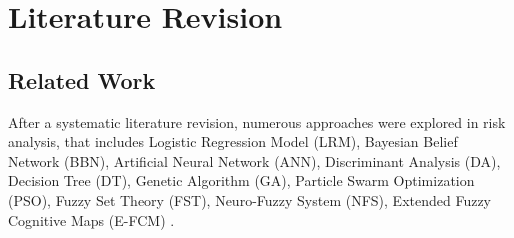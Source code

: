 \chapter{Literature Revision}\label{cap:background}

\section{Related Work}

After a systematic literature revision, numerous approaches were explored in risk analysis, that includes Logistic Regression Model (LRM), Bayesian Belief Network (BBN), Artificial Neural Network (ANN), Discriminant Analysis (DA), Decision Tree (DT), Genetic Algorithm (GA), Particle Swarm Optimization (PSO), Fuzzy Set Theory (FST), Neuro-Fuzzy System (NFS), Extended Fuzzy Cognitive Maps (E-FCM) \cite{mizuno2001prediction} \cite{huang2004neuro} \cite{hu2007software} \cite{attarzadeh2010novel} \cite{dzega2010classification} \cite{yu2011software} \cite{saxena2012software} \cite{dan2013improving}.

